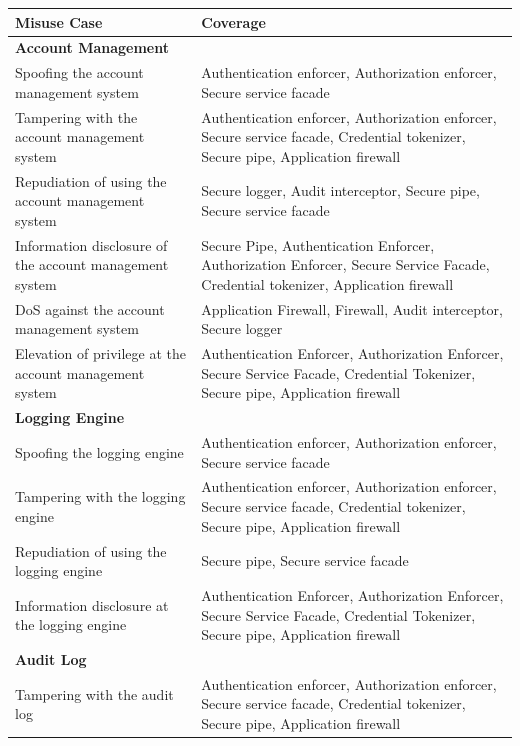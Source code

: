 \documentclass[a4paper,11pt]{report}
\begin{document}
\begin{table}[htpb]
\begin{center}
\begin{tabular}{| p{5cm} | p{} |}
\hline
\textbf{Misuse Case} 	& \textbf{Coverage} \\
\hline
\hline
\textbf{Account Management} & \\\hline
Spoofing the account management system & Authentication enforcer, Authorization enforcer, Secure service facade \\\hline
Tampering with the account management system & Authentication enforcer, Authorization enforcer, Secure service facade, Credential tokenizer, Secure pipe, Application firewall \\\hline
Repudiation of using the account management system & Secure logger, Audit interceptor, Secure pipe, Secure service facade\\\hline
Information disclosure of the account management system & Secure Pipe, Authentication Enforcer, Authorization Enforcer, Secure Service Facade, Credential tokenizer, Application firewall \\\hline
DoS against the account management system & Application Firewall, Firewall, Audit interceptor, Secure logger\\\hline
Elevation of privilege at the account management system & Authentication Enforcer, Authorization Enforcer, Secure Service Facade, Credential Tokenizer, Secure pipe, Application firewall \\\hline
\textbf{Logging Engine} & \\\hline
Spoofing the logging engine & Authentication enforcer, Authorization enforcer, Secure service facade \\\hline
Tampering with the logging engine & Authentication enforcer, Authorization enforcer, Secure service facade, Credential tokenizer, Secure pipe, Application firewall \\\hline
Repudiation of using the logging engine & Secure pipe, Secure service facade \\\hline
Information disclosure at the logging engine & Authentication Enforcer, Authorization Enforcer, Secure Service Facade, Credential Tokenizer, Secure pipe, Application firewall \\\hline
\textbf{Audit Log} & \\\hline
Tampering with the audit log & Authentication enforcer, Authorization enforcer, Secure service facade, Credential tokenizer, Secure pipe, Application firewall \\\hline

\end{tabular}
\end{center}
\end{table}
\end{document}
